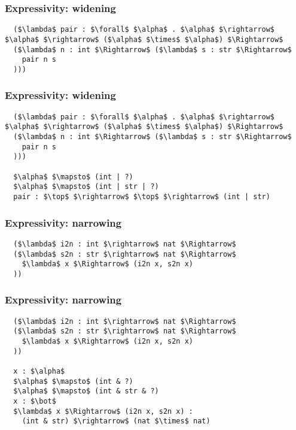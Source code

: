 \documentclass{beamer}
\begin{document}
\begin{frame}[fragile]
  \frametitle{Expressivity: widening}

  \begin{lstlisting}
  ($\lambda$ pair : $\forall$ $\alpha$ . $\alpha$ $\rightarrow$ $\alpha$ $\rightarrow$ ($\alpha$ $\times$ $\alpha$) $\Rightarrow$ 
  ($\lambda$ n : int $\Rightarrow$ ($\lambda$ s : str $\Rightarrow$ 
    pair n s
  )))

  \end{lstlisting}
\end{frame}


\begin{frame}[fragile]
  \frametitle{Expressivity: widening}

  \begin{lstlisting}
  ($\lambda$ pair : $\forall$ $\alpha$ . $\alpha$ $\rightarrow$ $\alpha$ $\rightarrow$ ($\alpha$ $\times$ $\alpha$) $\Rightarrow$ 
  ($\lambda$ n : int $\Rightarrow$ ($\lambda$ s : str $\Rightarrow$ 
    pair n s
  )))

  $\alpha$ $\mapsto$ (int | ?) 
  $\alpha$ $\mapsto$ (int | str | ?)
  pair : $\top$ $\rightarrow$ $\top$ $\rightarrow$ (int | str)  

  \end{lstlisting}
\end{frame}


\begin{frame}[fragile]
  \frametitle{Expressivity: narrowing}

  \begin{lstlisting}
  ($\lambda$ i2n : int $\rightarrow$ nat $\Rightarrow$ 
  ($\lambda$ s2n : str $\rightarrow$ nat $\Rightarrow$ 
    $\lambda$ x $\Rightarrow$ (i2n x, s2n x)
  ))
  \end{lstlisting}
\end{frame}

\begin{frame}[fragile]
  \frametitle{Expressivity: narrowing}

  \begin{lstlisting}
  ($\lambda$ i2n : int $\rightarrow$ nat $\Rightarrow$ 
  ($\lambda$ s2n : str $\rightarrow$ nat $\Rightarrow$ 
    $\lambda$ x $\Rightarrow$ (i2n x, s2n x)
  ))
  
  x : $\alpha$
  $\alpha$ $\mapsto$ (int & ?)
  $\alpha$ $\mapsto$ (int & str & ?)
  x : $\bot$
  $\lambda$ x $\Rightarrow$ (i2n x, s2n x) : 
    (int & str) $\rightarrow$ (nat $\times$ nat) 
  \end{lstlisting}
\end{frame}
\end{document}
